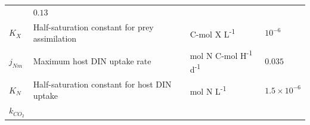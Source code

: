 \documentclass[]{elsarticle} %
\begin{document}
\begin{longtable}[c]{@{}llll@{}}
\begin{minipage}[t]{0.25\columnwidth}
\strut\end{minipage} &
\begin{minipage}[t]{0.12\columnwidth}\raggedright\strut
\(0.13\)
\strut\end{minipage}\tabularnewline
\begin{minipage}[t]{0.10\columnwidth}\raggedright\strut
\(K_X\)
\strut\end{minipage} &
\begin{minipage}[t]{0.45\columnwidth}\raggedright\strut
Half-saturation constant for prey assimilation
\strut\end{minipage} &
\begin{minipage}[t]{0.25\columnwidth}\raggedright\strut
C-mol X L\textsuperscript{-1}
\strut\end{minipage} &
\begin{minipage}[t]{0.12\columnwidth}\raggedright\strut
\(10^{-6}\)
\strut\end{minipage}\tabularnewline
\begin{minipage}[t]{0.10\columnwidth}\raggedright\strut
\(j_{Nm}\)
\strut\end{minipage} &
\begin{minipage}[t]{0.45\columnwidth}\raggedright\strut
Maximum host DIN uptake rate
\strut\end{minipage} &
\begin{minipage}[t]{0.25\columnwidth}\raggedright\strut
mol N C-mol H\textsuperscript{-1} d\textsuperscript{-1}
\strut\end{minipage} &
\begin{minipage}[t]{0.12\columnwidth}\raggedright\strut
\(0.035\)
\strut\end{minipage}\tabularnewline
\begin{minipage}[t]{0.10\columnwidth}\raggedright\strut
\(K_N\)
\strut\end{minipage} &
\begin{minipage}[t]{0.45\columnwidth}\raggedright\strut
Half-saturation constant for host DIN uptake
\strut\end{minipage} &
\begin{minipage}[t]{0.25\columnwidth}\raggedright\strut
mol N L\textsuperscript{-1}
\strut\end{minipage} &
\begin{minipage}[t]{0.12\columnwidth}\raggedright\strut
\(1.5\times 10^{-6}\)
\strut\end{minipage}\tabularnewline
\begin{minipage}[t]{0.10\columnwidth}\raggedright\strut
\(k_{CO_2}\)

\end{minipage}
\end{longtable}
\end{document}
